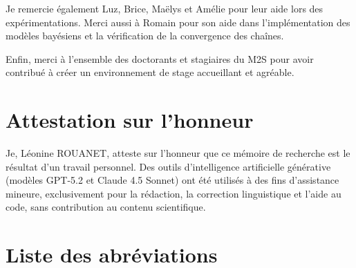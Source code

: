 \documentclass[11pt]{report}
\begin{document}
\medskip Je remercie également Luz, Brice, Maëlys et Amélie pour leur aide lors des expérimentations. Merci aussi à Romain pour son aide dans l'implémentation des modèles bayésiens et la vérification de la convergence des chaînes.

\medskip Enfin, merci à l'ensemble des doctorants et stagiaires du M2S pour avoir contribué à créer un environnement de stage accueillant et agréable.

\newpage

\chapter*{Attestation sur l'honneur}
Je, Léonine ROUANET, atteste sur l'honneur que ce mémoire de recherche est le résultat d'un travail personnel. Des outils d'intelligence artificielle générative (modèles GPT-5.2 et Claude 4.5 Sonnet) ont été utilisés à des fins d'assistance mineure, exclusivement pour la rédaction, la correction linguistique et l'aide au code, sans contribution au contenu scientifique.

\newpage

\tableofcontents
\newpage

\chapter*{Liste des abréviations}

\vspace{0.5cm}
\end{document}
